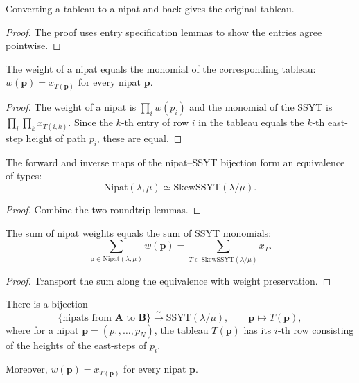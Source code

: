 \begin{lemma}
\label{lem.sf.ssyt-nipat-roundtrip-2}
\leanhelper
\leanok
Converting a tableau to a nipat and back gives the original tableau.
\end{lemma}

\begin{proof}
\leanok
The proof uses entry specification lemmas to show the entries agree pointwise.
\end{proof}

\begin{lemma}
\label{lem.sf.nipat-to-ssyt-weight}
\leanhelper
\leanok
The weight of a nipat equals the monomial of the corresponding tableau:
$w(\mathbf{p}) = x_{T(\mathbf{p})}$ for every nipat $\mathbf{p}$.
\end{lemma}

\begin{proof}
\leanok
The weight of a nipat is $\prod_i w(p_i)$ and the monomial of the SSYT
is $\prod_i \prod_k x_{T(i,k)}$. Since the $k$-th entry of row $i$ in the
tableau equals the $k$-th east-step height of path $p_i$,
these are equal.
\end{proof}

\begin{lemma}
\label{lem.sf.nipat-ssyt-equiv}
\leanhelper
\leanok
The forward and inverse maps of the nipat--SSYT bijection form an
equivalence of types:
\[
\mathrm{Nipat}(\lambda, \mu) \simeq \mathrm{SkewSSYT}(\lambda/\mu).
\]
\end{lemma}

\begin{proof}
Combine the two roundtrip lemmas.
\end{proof}

\begin{lemma}
\label{lem.sf.nipat-weight-eq-ssyt-sum}
\leanhelper
\leanok
The sum of nipat weights equals the sum of SSYT monomials:
\[
\sum_{\mathbf{p} \in \mathrm{Nipat}(\lambda, \mu)} w(\mathbf{p})
= \sum_{T \in \mathrm{SkewSSYT}(\lambda/\mu)} x_T.
\]
\end{lemma}

\begin{proof}
Transport the sum along the equivalence with weight preservation.
\end{proof}

\begin{theorem}
\label{thm.sf.jt-obs2}
\leanhelper
\leanok
There is a bijection
\[
\{\text{nipats from } \mathbf{A} \text{ to } \mathbf{B}\}
\xrightarrow{\sim} \mathrm{SSYT}(\lambda/\mu),
\qquad \mathbf{p} \mapsto T(\mathbf{p}),
\]
where for a nipat $\mathbf{p} = (p_1, \ldots, p_N)$, the tableau
$T(\mathbf{p})$ has its $i$-th row consisting of the heights of the
east-steps of $p_i$.

Moreover, $w(\mathbf{p}) = x_{T(\mathbf{p})}$ for every nipat $\mathbf{p}$.
\end{theorem}

